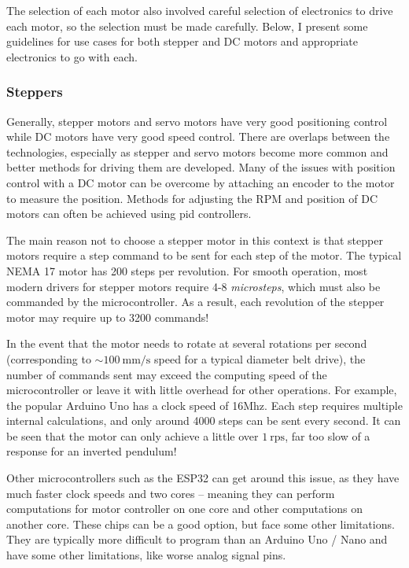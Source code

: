 The selection of each motor also involved careful selection of electronics to drive each motor, so the selection must be made carefully. Below, I present some guidelines for use cases for both stepper and DC motors and appropriate electronics to go with each.

\subsubsection{Steppers}
Generally, stepper motors and servo motors have very good positioning control while DC motors have very good speed control. There are overlaps between the technologies, especially as stepper and servo motors become more common and better methods for driving them are developed. Many of the issues with position control with a DC motor can be overcome by attaching an encoder to the motor to measure the position. Methods for adjusting the RPM and position of DC motors can often be achieved using \gls{pid} controllers.

The main reason not to choose a stepper motor in this context is that stepper motors require a step command to be sent for each step of the motor. The typical NEMA 17 motor has 200 steps per revolution. For smooth operation, most modern drivers for stepper motors require 4-8 \textit{microsteps}, which must also be commanded by the microcontroller. As a result, each revolution of the stepper motor may require up to 3200 commands!

In the event that the motor needs to rotate at several rotations per second (corresponding to $\sim100 \  \mathrm{mm/s}$ speed for a typical diameter belt drive), the number of commands sent may exceed the computing speed of the microcontroller or leave it with little overhead for other operations. For example, the popular Arduino Uno has a clock speed of 16Mhz. Each step requires multiple internal calculations, and only around 4000 steps can be sent every second. It can be seen that the motor can only achieve a little over $1 \mathrm{\ rps}$, far too slow of a response for an inverted pendulum!

Other microcontrollers such as the ESP32 can get around this issue, as they have much faster clock speeds and two cores -- meaning they can perform computations for motor controller on one core and other computations on another core. These chips can be a good option, but face some other limitations. They are typically more difficult to program than an Arduino Uno / Nano and have some other limitations, like worse analog signal pins.

